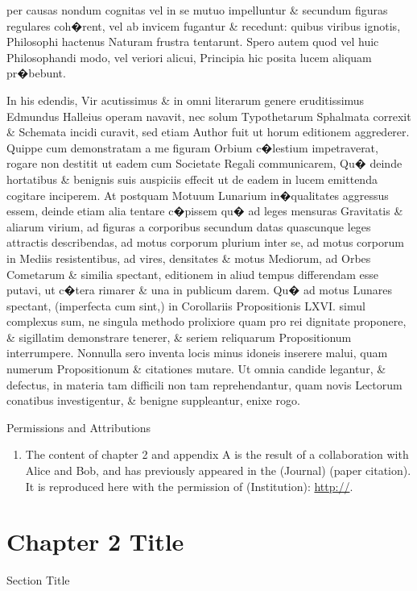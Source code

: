\documentclass[twoside,12pt,draft]{sty/ucthesis-CA2012}
\begin{document}
\begin{mainmatter}
per causas nondum cognitas vel in se mutuo impelluntur \& secundum figuras regulares coh�rent, vel ab invicem fugantur \& recedunt: quibus viribus ignotis, Philosophi hactenus Naturam frustra tentarunt. Spero autem quod vel huic Philosophandi modo, vel veriori alicui, Principia hic posita lucem aliquam pr�bebunt.

In his edendis, Vir acutissimus \& in omni literarum genere eruditissimus Edmundus Halleius operam navavit, nec solum Typothetarum Sphalmata correxit \& Schemata incidi curavit, sed etiam Author fuit ut horum editionem aggrederer. Quippe cum demonstratam a me figuram Orbium c�lestium impetraverat, rogare non destitit ut eadem cum Societate Regali communicarem, Qu� deinde hortatibus \& benignis suis auspiciis effecit ut de eadem in lucem emittenda cogitare inciperem. At postquam Motuum Lunarium in�qualitates aggressus essem, deinde etiam alia tentare c�pissem qu� ad leges mensuras Gravitatis \& aliarum virium, ad figuras a corporibus secundum datas quascunque leges attractis describendas, ad motus corporum plurium inter se, ad motus corporum in Mediis resistentibus, ad vires, densitates \& motus Mediorum, ad Orbes Cometarum \& similia spectant, editionem in aliud tempus differendam esse putavi, ut c�tera rimarer \& una in publicum darem. Qu� ad motus Lunares spectant, (imperfecta cum sint,) in Corollariis Propositionis LXVI. simul complexus sum, ne singula methodo prolixiore quam pro rei dignitate proponere, \& sigillatim demonstrare tenerer, \& seriem reliquarum Propositionum interrumpere. Nonnulla sero inventa locis minus idoneis inserere malui, quam numerum Propositionum \& citationes mutare. Ut omnia candide legantur, \& defectus, in materia tam difficili non tam reprehendantur, quam novis Lectorum conatibus investigentur, \& benigne suppleantur, enixe rogo.


\begin{section}{Permissions and Attributions}
\begin{enumerate}

\item The content of chapter 2 and appendix A is the result of a collaboration with Alice and Bob, and has previously appeared in the (Journal) (paper citation). It is reproduced here with the permission of (Institution): \url{http://}.

\end{enumerate}
\end{section}

\chapter{Chapter 2 Title}
\begin{section}{Section Title}


\end{section}
\end{mainmatter}
\end{document}
